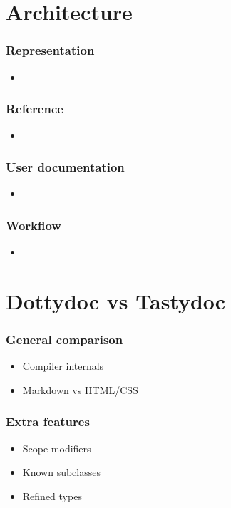 \documentclass{beamer}
\begin{document}
\section{Architecture}

\begin{frame}
  \frametitle{Representation}
  \begin{itemize}
    \item 
  \end{itemize}
\end{frame}

\begin{frame}
  \frametitle{Reference}
  \begin{itemize}
    \item 
  \end{itemize}
\end{frame}

\begin{frame}
  \frametitle{User documentation}
  \begin{itemize}
    \item 
  \end{itemize}
\end{frame}

\begin{frame}
  \frametitle{Workflow}
  \begin{itemize}
    \item 
  \end{itemize}
\end{frame}

\section{Dottydoc vs Tastydoc}

\begin{frame}
  \frametitle{General comparison}
  \begin{itemize}
    \item Compiler internals \pause
    \item Markdown vs HTML/CSS
  \end{itemize}
\end{frame}

\begin{frame}
  \frametitle{Extra features}
  \begin{itemize}
    \item Scope modifiers \pause
    \item Known subclasses \pause
    \item Refined types
  \end{itemize}
\end{frame}
\end{document}

